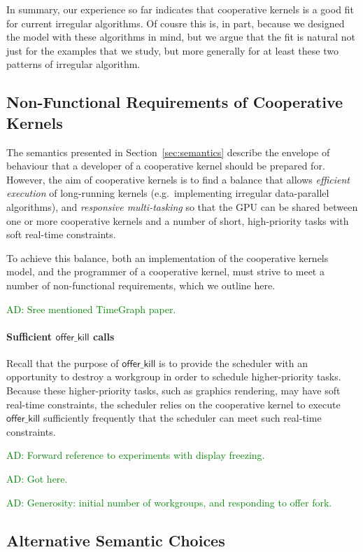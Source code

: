 \documentclass[numbers,nocopyrightspace,10pt]{sigplanconf}
\newcommand{\ADComment}[1]{\textcolor{green}{AD: #1}}
\newcommand{\offerkill}{\mathsf{offer\_kill}}
\begin{document}
In summary, our experience so far indicates that cooperative kernels
is a good fit for current irregular algorithms.  Of cousre this is, in
part, because we designed the model with these algorithms in mind, but
we argue that the fit is natural not just for the examples that we
study, but more generally for at least these two patterns of irregular
algorithm.


\subsection{Non-Functional Requirements of Cooperative Kernels}\label{sec:nonfunctional}

The semantics presented in Section~\ref{sec:semantics} describe the envelope of
behaviour that a developer of a cooperative kernel should be prepared
for.
%
However, the aim of cooperative kernels is to find a balance that
allows \emph{efficient execution} of long-running kernels
(e.g.\ implementing irregular data-parallel algorithms), and
\emph{responsive multi-tasking} so that the GPU can be shared between
one or more cooperative kernels and a number of short, high-priority
tasks with soft real-time constraints.

To achieve this balance, both an implementation of the cooperative
kernels model, and the programmer of a cooperative kernel, must strive
to meet a number of non-functional requirements, which we outline
here.

\ADComment{Sree mentioned TimeGraph paper.}

\paragraph{Sufficient $\offerkill$ calls}

Recall that the purpose of $\offerkill$ is to provide the scheduler
with an opportunity to destroy a workgroup in order to schedule
higher-priority tasks.  Because these higher-priority tasks, such as
graphics rendering, may have soft real-time constraints, the scheduler
relies on the cooperative kernel to execute $\offerkill$ sufficiently
frequently that the scheduler can meet such real-time constraints.

\ADComment{Forward reference to experiments with display freezing.}

\ADComment{Got here.}

\ADComment{Generosity: initial number of workgroups, and responding to offer fork.}

\subsection{Alternative Semantic Choices}\label{sec:semanticalternatives}
\end{document}
